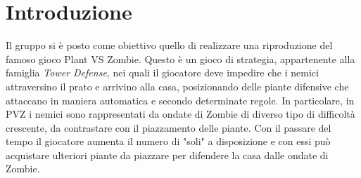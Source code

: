 
\section*{Introduzione}
Il gruppo si è posto come obiettivo quello di realizzare una riproduzione del famoso gioco Plant VS Zombie.
Questo è un gioco di strategia, appartenente alla famiglia \textit{Tower Defense}, nei quali il giocatore
deve impedire che  i nemici attraversino il prato e arrivino alla casa,
posizionando delle piante difensive che attaccano in maniera automatica e secondo determinate regole.
In particolare, in PVZ i nemici sono rappresentati da ondate di Zombie di diverso tipo di difficoltà crescente,
da contrastare con il piazzamento delle piante.
Con il passare del tempo il giocatore aumenta il numero di "soli" a disposizione e con essi può acquistare
ulteriori piante da piazzare per difendere la casa dalle ondate di Zombie.